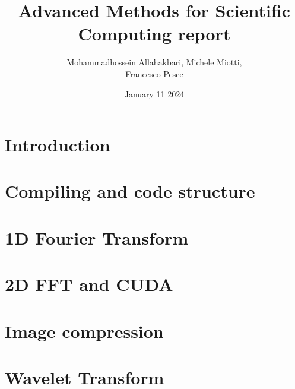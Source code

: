 \documentclass{article}
\title{Advanced Methods for Scientific Computing report}
\author{Mohammadhossein Allahakbari, Michele Miotti, \\Francesco Pesce}
\date{January 11 2024}
\begin{document}
\maketitle


\section{Introduction}
	

\section{Compiling and code structure}
	

\section{1D Fourier Transform}
	 

\section{2D FFT and CUDA}\label{sec:cuda}
	 

\section{Image compression}
	 

\section{Wavelet Transform}\label{sec:wavelet}
	 




\end{document}
